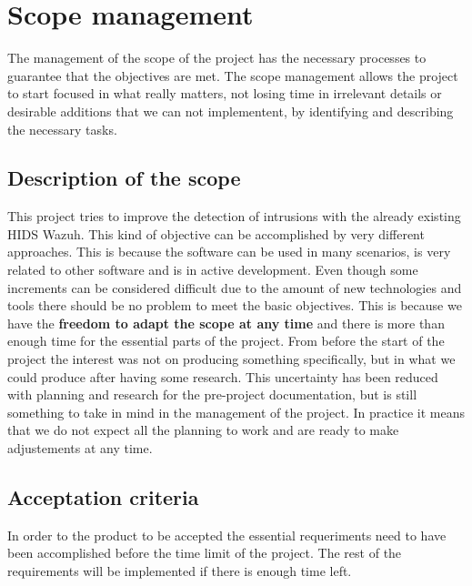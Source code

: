 \section{Scope management}
The management of the scope of the project has the necessary processes to guarantee that the objectives are met.
The scope management allows the project to start focused in what really matters, not losing time in irrelevant details or desirable additions that we can not implementent, by identifying and describing the necessary tasks.

\subsection{Description of the scope}
This project tries to improve the detection of intrusions with the already existing HIDS Wazuh. This kind of objective can be accomplished by very different approaches. This is because the software can be used in many scenarios, is very related to other software and is in active development.
\linej
Even though some increments can be considered difficult due to the amount of new technologies and tools there should be no problem to meet the basic objectives.
This is because we have the \textbf{freedom to adapt the scope at any time} and there is more than enough time for the essential parts of the project.
\linej
\linej
From before the start of the project the interest was not on producing something specifically, but in what we could produce after having some research. This uncertainty has been reduced with planning and research for the pre-project documentation, but is still something to take in mind in the management of the project.
\linej
In practice it means that we do not expect all the planning to work and are ready to make adjustements at any time.

\subsection{Acceptation criteria}
In order to the product to be accepted the essential requeriments need to have been accomplished before the time limit of the project.
The rest of the requirements will be implemented if there is enough time left.

